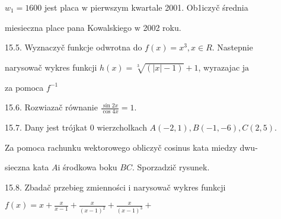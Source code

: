 \documentclass[a4paper,12pt]{article}
\begin{document}
$w_{1}=1600$ jest placa $\mathrm{w}$ pierwszym kwartale 2001. Ob1iczyč średnia

miesieczna place pana Kowalskiego $\mathrm{w}$ 2002 roku.

15.5. Wyznaczyč funkcje odwrotna do $f(x) = x^{3}, x \in R$. Nastepnie

narysowač wykres funkcji $h(x) = \sqrt[3]{(|x|-1)}+1$, wyrazajac $\mathrm{j}\mathrm{a}$

za pomoca $f^{-1}$

15.6. Rozwiazač równanie $\displaystyle \frac{\sin 2x}{\cos 4x}=1.$

15.7. Dany jest trójkat $0$ wierzcholkach $A(-2,1), B(-1,-6), C(2,5).$

Za pomoca rachunku wektorowego obliczyč cosinus kata miedzy dwu-

sieczna kata $A\mathrm{i}$ środkowa boku $BC$. Sporzadzič rysunek.

15.8. Zbadač przebieg zmienności $\mathrm{i}$ narysowač wykres funkcji

$f(x)=x+\displaystyle \frac{x}{x-1}+\frac{x}{(x-1)^{2}}+\frac{x}{(x-1)^{3}}+$
\end{document}
